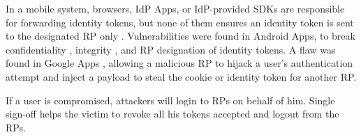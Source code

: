 In a mobile system,
browsers, IdP Apps,
    or IdP-provided SDKs %
         are responsible for forwarding identity tokens, %
but none of them ensures an identity token is sent to the designated RP only \cite{ChenPCTKT14,WangZLLYLG15}.
Vulnerabilities were found in Android Apps,
    to break confidentiality \cite{ChenPCTKT14,WangZLLYLG15,YangLS17,ShiWL19}, integrity \cite{ChenPCTKT14,YangLS17}, and RP designation \cite{ChenPCTKT14,ShiWL19} of identity tokens.
A flaw was found in Google Apps \cite{ArmandoCCCPS13}, allowing a malicious RP to hijack a user's authentication attempt and inject a payload to steal the cookie or identity token for another RP.

If a user is compromised,
    attackers will login to RPs on behalf of him.
Single sign-off \cite{GhasemisharifRC18} helps the victim
 to revoke all his tokens accepted and logout from the RPs.



